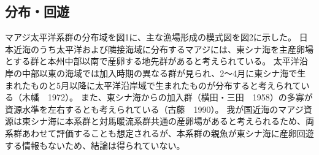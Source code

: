 \subsection{分布・回遊} 
マアジ太平洋系群の分布域を図1に、主な漁場形成の模式図を図2に示した。
日本近海のうち太平洋および隣接海域に分布するマアジには、東シナ海を主産卵場とする群と本州中部以南で産卵する地先群があると考えられている。
太平洋沿岸の中部以東の海域では加入時期の異なる群が見られ、2～4月に東シナ海で生まれたものと5月以降に太平洋沿岸域で生まれたものが分布すると考えられている（木幡　1972）。
また、東シナ海からの加入群（横田・三田　1958）の多寡が資源水準を左右するとも考えられている（古藤　1990）。
我が国近海のマアジ資源は東シナ海に本系群と対馬暖流系群共通の産卵場があると考えられるため、両系群あわせて評価することも想定されるが、本系群の親魚が東シナ海に産卵回遊する情報もないため、結論は得られていない。

